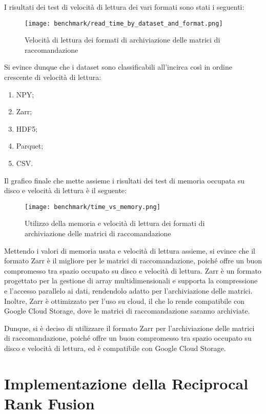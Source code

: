 I risultati dei test di velocità di lettura dei vari formati sono stati i seguenti:
\begin{figure}[!h]
    \centering
    \texttt{[image: benchmark/read\_time\_by\_dataset\_and\_format.png]}
    \caption{Velocità di lettura dei formati di archiviazione delle matrici di raccomandazione}
    \label{fig:read-speed-recommendation-matrices}
\end{figure}

Si evince dunque che i dataset sono classificabili all'incirca così in ordine crescente di velocità di lettura:
\begin{enumerate}
    \item NPY;
    \item Zarr;
    \item HDF5;
    \item Parquet;
    \item CSV.
\end{enumerate}

Il grafico finale che mette assieme i risultati dei test di memoria occupata su disco e velocità di lettura è il seguente:

\begin{figure}[!h]
    \centering
    \texttt{[image: benchmark/time\_vs\_memory.png]}
    \caption{Utilizzo della memoria e velocità di lettura dei formati di archiviazione delle matrici di raccomandazione}
    \label{fig:memory-usage-and-read-speed-recommendation-matrices}
\end{figure}

Mettendo i valori di memoria usata e velocità di lettura assieme, si evince che il formato Zarr è il migliore per le matrici di raccomandazione, poiché offre un buon compromesso tra spazio occupato su disco e velocità di lettura. Zarr è un formato progettato per la gestione di array multidimensionali e supporta la compressione e l'accesso parallelo ai dati, rendendolo adatto per l'archiviazione delle matrici. Inoltre, Zarr è ottimizzato per l'uso su cloud, il che lo rende compatibile con Google Cloud Storage, dove le matrici di raccomandazione saranno archiviate.

Dunque, si è deciso di utilizzare il formato Zarr per l'archiviazione delle matrici di raccomandazione, poiché offre un buon compromesso tra spazio occupato su disco e velocità di lettura, ed è compatibile con Google Cloud Storage.


\section{Implementazione della Reciprocal Rank Fusion}

